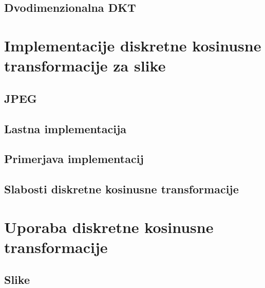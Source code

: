 \documentclass[a4paper, 12pt]{book}
\begin{document}
\section{Dvodimenzionalna DKT}





\chapter{Implementacije diskretne kosinusne transformacije za slike}
\label{ch2}

\section{JPEG}

\section{Lastna implementacija}

\section{Primerjava implementacij}

\section{Slabosti diskretne kosinusne transformacije}


\chapter{Uporaba diskretne kosinusne transformacije}
\label{ch1}

\section{Slike}




\cleardoublepage
{}


\end{document}
